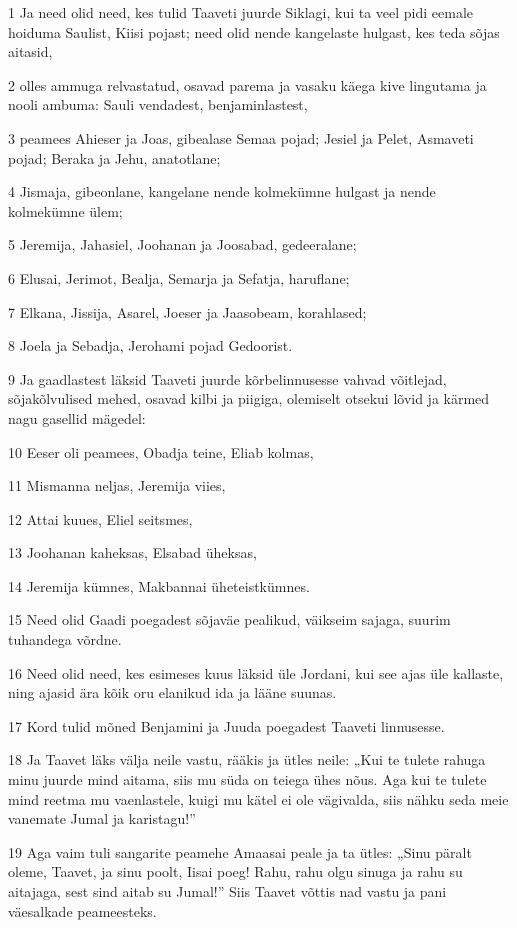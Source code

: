 \par 1 Ja need olid need, kes tulid Taaveti juurde Siklagi, kui ta veel pidi eemale hoiduma Saulist, Kiisi pojast; need olid nende kangelaste hulgast, kes teda sõjas aitasid,
\par 2 olles ammuga relvastatud, osavad parema ja vasaku käega kive lingutama ja nooli ambuma: Sauli vendadest, benjaminlastest,
\par 3 peamees Ahieser ja Joas, gibealase Semaa pojad; Jesiel ja Pelet, Asmaveti pojad; Beraka ja Jehu, anatotlane;
\par 4 Jismaja, gibeonlane, kangelane nende kolmekümne hulgast ja nende kolmekümne ülem;
\par 5 Jeremija, Jahasiel, Joohanan ja Joosabad, gedeeralane;
\par 6 Elusai, Jerimot, Bealja, Semarja ja Sefatja, haruflane;
\par 7 Elkana, Jissija, Asarel, Joeser ja Jaasobeam, korahlased;
\par 8 Joela ja Sebadja, Jerohami pojad Gedoorist.
\par 9 Ja gaadlastest läksid Taaveti juurde kõrbelinnusesse vahvad võitlejad, sõjakõlvulised mehed, osavad kilbi ja piigiga, olemiselt otsekui lõvid ja kärmed nagu gasellid mägedel:
\par 10 Eeser oli peamees, Obadja teine, Eliab kolmas,
\par 11 Mismanna neljas, Jeremija viies,
\par 12 Attai kuues, Eliel seitsmes,
\par 13 Joohanan kaheksas, Elsabad üheksas,
\par 14 Jeremija kümnes, Makbannai üheteistkümnes.
\par 15 Need olid Gaadi poegadest sõjaväe pealikud, väikseim sajaga, suurim tuhandega võrdne.
\par 16 Need olid need, kes esimeses kuus läksid üle Jordani, kui see ajas üle kallaste, ning ajasid ära kõik oru elanikud ida ja lääne suunas.
\par 17 Kord tulid mõned Benjamini ja Juuda poegadest Taaveti linnusesse.
\par 18 Ja Taavet läks välja neile vastu, rääkis ja ütles neile: „Kui te tulete rahuga minu juurde mind aitama, siis mu süda on teiega ühes nõus. Aga kui te tulete mind reetma mu vaenlastele, kuigi mu kätel ei ole vägivalda, siis nähku seda meie vanemate Jumal ja karistagu!”
\par 19 Aga vaim tuli sangarite peamehe Amaasai peale ja ta ütles: „Sinu päralt oleme, Taavet, ja sinu poolt, Iisai poeg! Rahu, rahu olgu sinuga ja rahu su aitajaga, sest sind aitab su Jumal!” Siis Taavet võttis nad vastu ja pani väesalkade peameesteks.
